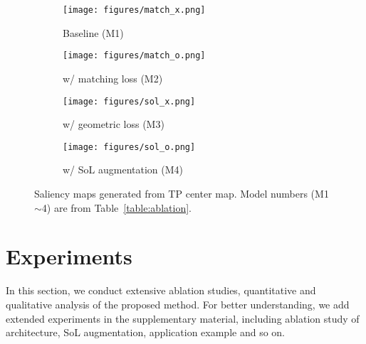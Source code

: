\documentclass[letterpaper]{article} \usepackage{aaai22}  \usepackage{times}  \usepackage{helvet}  \usepackage{courier}  \usepackage[hyphens]{url}  \usepackage{graphicx} \urlstyle{rm} \def\UrlFont{\rm}  \usepackage{natbib}  \usepackage{caption} \DeclareCaptionStyle{ruled}{labelfont=normalfont,labelsep=colon,strut=off} \frenchspacing  \setlength{\pdfpagewidth}{8.5in}  \setlength{\pdfpageheight}{11in}  \usepackage{algorithm}
\begin{document}
\begin{figure}[t!]
    \centering
     \begin{subfigure}[b]{0.48\columnwidth}
        \centering\texttt{[image: figures/match\_x.png]}
         \caption{Baseline (M1)}
         \label{fig:match_x}
     \end{subfigure}
    \begin{subfigure}[b]{0.48\columnwidth}
        \centering\texttt{[image: figures/match\_o.png]}
         \caption{w/ matching loss (M2)}
         \label{fig:match_o}
     \end{subfigure}
     \begin{subfigure}[b]{0.48\columnwidth}
        \centering\texttt{[image: figures/sol\_x.png]}
         \caption{w/ geometric loss (M3)}
         \label{fig:sol_x}
     \end{subfigure}
    \begin{subfigure}[b]{0.48\columnwidth}
        \centering\texttt{[image: figures/sol\_o.png]}
         \caption{w/ SoL augmentation (M4)}
         \label{fig:sol_o}
     \end{subfigure}
\caption{Saliency maps generated from TP center map. Model numbers (M1$\sim$4) are from Table~\ref{table:ablation}.}
\label{fig:comparison_cam}
\end{figure}

\section{Experiments}
In this section, we conduct extensive ablation studies, quantitative and qualitative analysis of the proposed method.
For better understanding, we add extended experiments in the supplementary material, including ablation study of architecture, SoL augmentation, application example and so on.
\end{document}
